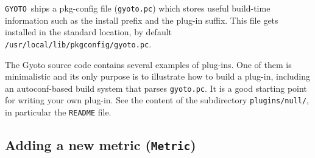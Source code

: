 \documentclass[a4paper,12pt]{article}
\newcommand{\GYOTO}{\texttt{GYOTO}}
\newcommand{\Metric}{\texttt{Metric}}
\begin{document}
\GYOTO\ ships a pkg-config file (\texttt{gyoto.pc}) which stores
useful build-time information such as the install prefix and the
plug-in suffix. This file gets installed in the standard location, by
default \texttt{/usr/local/lib/pkgconfig/gyoto.pc}.

The Gyoto source code contains several examples of plug-ins. One of
them is minimalistic and its only purpose is to illustrate how to
build a plug-in, including an autoconf-based build system that parses
\texttt{gyoto.pc}. It is a good starting point for writing your own
plug-in. See the content of the subdirectory \texttt{plugins/null/},
in particular the \texttt{README} file.

\subsection{Adding a new metric (\Metric)}
\end{document}
